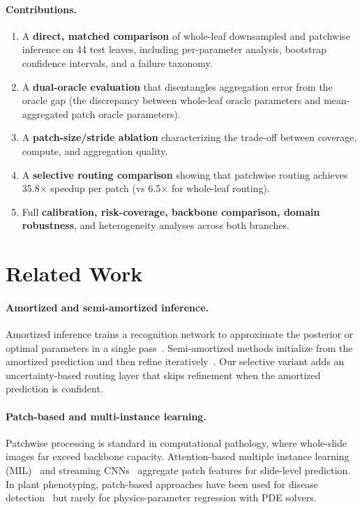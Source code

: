 \documentclass[11pt]{article}
\begin{document}
\paragraph{Contributions.}
\begin{enumerate}[leftmargin=1.5em,itemsep=2pt]
\item A \textbf{direct, matched comparison} of whole-leaf downsampled and patchwise inference on 44 test leaves, including per-parameter analysis, bootstrap confidence intervals, and a failure taxonomy.
\item A \textbf{dual-oracle evaluation} that disentangles aggregation error from the oracle gap (the discrepancy between whole-leaf oracle parameters and mean-aggregated patch oracle parameters).
\item A \textbf{patch-size/stride ablation} characterizing the trade-off between coverage, compute, and aggregation quality.
\item A \textbf{selective routing comparison} showing that patchwise routing achieves 35.8$\times$ speedup per patch (vs 6.5$\times$ for whole-leaf routing).
\item Full \textbf{calibration, risk-coverage, backbone comparison, domain robustness}, and heterogeneity analyses across both branches.
\end{enumerate}


\section{Related Work}
\label{sec:related}

\paragraph{Amortized and semi-amortized inference.}
Amortized inference trains a recognition network to approximate the posterior or optimal parameters in a single pass~\citep{kingma2014auto,papamakarios2019sequential}.  Semi-amortized methods initialize from the amortized prediction and then refine iteratively~\citep{kim2018semi,marino2018iterative,wang2020tent}.  Our selective variant adds an uncertainty-based routing layer that skips refinement when the amortized prediction is confident.

\paragraph{Patch-based and multi-instance learning.}
Patchwise processing is standard in computational pathology, where whole-slide images far exceed backbone capacity.  Attention-based multiple instance learning (MIL)~\citep{ilse2018attention,campanella2019clinical,lu2021data,li2021dual} and streaming CNNs~\citep{pinckaers2020streaming} aggregate patch features for slide-level prediction.  In plant phenotyping, patch-based approaches have been used for disease detection~\citep{barbedo2018factors} but rarely for physics-parameter regression with PDE solvers.
\end{document}

